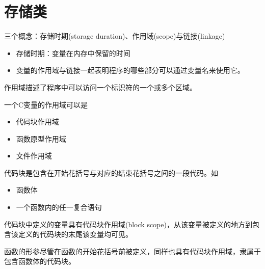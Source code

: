 \section{存储类}

\begin{frame}[fragile]\ft{\secname}
  三个概念：存储时期{\tf (storage duration)}、作用域{\tf (scope)}与链接{\tf (linkage)}
  \begin{itemize}
  \item 存储时期：变量在内存中保留的时间
  \item 变量的作用域与链接一起表明程序的哪些部分可以通过变量名来使用它。
  \end{itemize}
\end{frame}

\begin{frame}[fragile]
  作用域描述了程序中可以访问一个标识符的一个或多个区域。\vspace{0.1in}

  一个C变量的作用域可以是
  \begin{itemize}
  \item 代码块作用域
  \item 函数原型作用域
  \item 文件作用域
  \end{itemize}

\end{frame}

\begin{frame}[fragile]
  \textcolor{acolor1}{代码块}是包含在开始花括号与对应的结束花括号之间的一段代码。如
  \begin{itemize}
  \item 函数体
  \item 一个函数内的任一复合语句
  \end{itemize}
\end{frame}

\begin{frame}[fragile]

  代码块中定义的变量具有\textcolor{acolor1}{代码块作用域\tf (block scope)}，从该变量被定义的地方到包含该定义的代码块的末尾该变量均可见。\vspace{0.1in}

  \begin{zhu}
    函数的形参尽管在函数的开始花括号前被定义，同样也具有代码块作用域，隶属于包含函数体的代码块。
  \end{zhu}

\end{frame}

